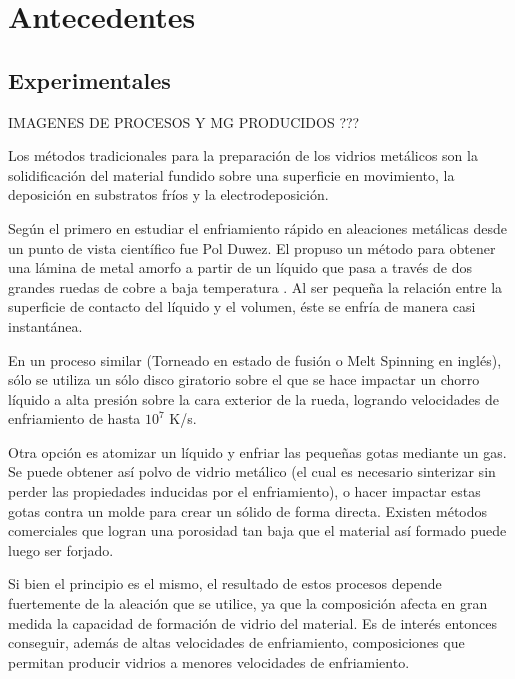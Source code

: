 \section{Antecedentes}
\label{S1_2}


\subsection{Experimentales}
\label{S1_2_1}

IMAGENES DE PROCESOS Y MG PRODUCIDOS ??? 

Los métodos tradicionales para la preparación de los vidrios metálicos son la solidificación del material fundido sobre una superficie en movimiento, la deposición en substratos fríos y la electrodeposición.

Según \cite{liebermann93} el primero en estudiar el enfriamiento rápido en aleaciones metálicas desde un punto de vista científico fue Pol Duwez. El propuso un método para obtener una lámina de metal amorfo a partir de un líquido que pasa a través de dos grandes ruedas de cobre a baja temperatura \citep{duwez60}. Al ser pequeña la relación entre la superficie de contacto del líquido y el volumen, éste se enfría de manera casi instantánea.

En un proceso similar (Torneado en estado de fusión o Melt Spinning en inglés), sólo se utiliza un sólo disco giratorio sobre el que se hace impactar un chorro líquido a alta presión sobre la cara exterior de la rueda, logrando velocidades de enfriamiento de hasta $10^{7}$ K/s.

Otra opción es atomizar un líquido y enfriar las pequeñas gotas mediante un gas. Se puede obtener así polvo de vidrio metálico (el cual es necesario sinterizar sin perder las propiedades inducidas por el enfriamiento), o hacer impactar estas gotas contra un molde para crear un sólido de forma directa. Existen métodos comerciales que logran una porosidad tan baja que el material así formado puede luego ser forjado.

Si bien el principio es el mismo, el resultado de estos procesos depende fuertemente de la aleación que se utilice, ya que la composición afecta en gran medida la capacidad de formación de vidrio del material. Es de interés entonces conseguir, además de altas velocidades de enfriamiento, composiciones que permitan producir vidrios a menores velocidades de enfriamiento.

